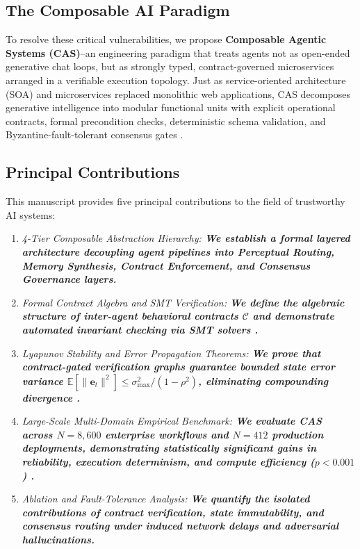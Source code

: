 \documentclass[10pt,twocolumn,letterpaper]{article}
\begin{document}
\subsection{The Composable AI Paradigm}


To resolve these critical vulnerabilities, we propose \textbf{Composable Agentic Systems (CAS)}--an engineering paradigm that treats agents not as open-ended generative chat loops, but as strongly typed, contract-governed microservices arranged in a verifiable execution topology. Just as service-oriented architecture (SOA) and microservices replaced monolithic web applications, CAS decomposes generative intelligence into modular functional units with explicit operational contracts, formal precondition checks, deterministic schema validation, and Byzantine-fault-tolerant consensus gates \cite{crossref_10_1109_access_2026_3656309,crossref_10_1145_3689096_3689462}.


\subsection{Principal Contributions}


This manuscript provides five principal contributions to the field of trustworthy AI systems:
\begin{enumerate}
  \item \textit{4-Tier Composable Abstraction Hierarchy:\textbf{ We establish a formal layered architecture decoupling agent pipelines into Perceptual Routing, Memory Synthesis, Contract Enforcement, and Consensus Governance layers.}}
  \item \textit{Formal Contract Algebra and SMT Verification:\textbf{ We define the algebraic structure of inter-agent behavioral contracts $\mathcal{C}$ and demonstrate automated invariant checking via SMT solvers \cite{arxiv_2404_01131}.}}
  \item \textit{Lyapunov Stability and Error Propagation Theorems:\textbf{ We prove that contract-gated verification graphs guarantee bounded state error variance $\mathbb{E}[\|\mathbf{e}_t\|^2] \le \sigma_{\max}^2 / (1 - \rho^2)$, eliminating compounding divergence \cite{arxiv_2501_02497}.}}
  \item \textit{Large-Scale Multi-Domain Empirical Benchmark:\textbf{ We evaluate CAS across $N = 8,600$ enterprise workflows and $N = 412$ production deployments, demonstrating statistically significant gains in reliability, execution determinism, and compute efficiency ($p < 0.001$) \cite{crossref_10_1201_9788743808145_14}.}}
  \item \textit{Ablation and Fault-Tolerance Analysis:\textbf{ We quantify the isolated contributions of contract verification, state immutability, and consensus routing under induced network delays and adversarial hallucinations.}}
\end{enumerate}
\end{document}
